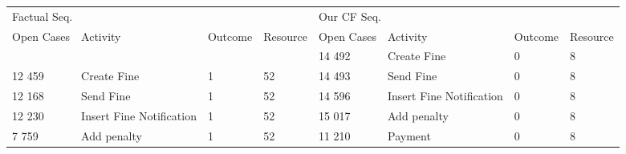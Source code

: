 \begin{tabular}{llllllll}
\toprule
\multicolumn{4}{l}{Factual Seq.} & \multicolumn{4}{l}{Our CF Seq.} \\
Open Cases & Activity & Outcome & Resource & Open Cases & Activity & Outcome & Resource \\
\midrule
 &  &  &  & 14 492 & Create Fine & 0 & 8 \\
12 459 & Create Fine & 1 & 52 & 14 493 & Send Fine & 0 & 8 \\
12 168 & Send Fine & 1 & 52 & 14 596 & Insert Fine Notification & 0 & 8 \\
12 230 & Insert Fine Notification & 1 & 52 & 15 017 & Add penalty & 0 & 8 \\
7 759 & Add penalty & 1 & 52 & 11 210 & Payment & 0 & 8 \\
\bottomrule
\end{tabular}
